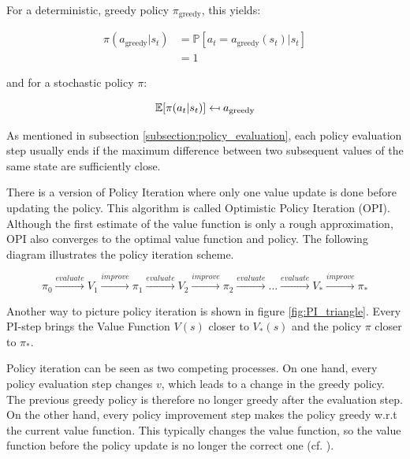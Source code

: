 For a deterministic, greedy policy $\pi_{\text{greedy}}$, this yields:

\begin{align}
\pi(a_{\text{greedy}}|s_t)&=\mathbb{P}[a_t=a_{\text{greedy}}(s_t)|s_t] \\ &=1
\end{align}

and for a stochastic policy $\pi$:

\begin{equation}
\mathbb{E}[\pi(a_t | s_t)] \mathrel{\reflectbox{\ensuremath{\mapsto}}} a_{\text{greedy}}
\end{equation}

As mentioned in subsection \ref{subsection:policy_evaluation}, each policy evaluation step usually ends if the maximum difference between two subsequent values of the same state are sufficiently close.

There is a version of Policy Iteration where only one value update is done before updating the policy. This algorithm is called Optimistic Policy Iteration (OPI). Although the first estimate of the value function is only a rough approximation, OPI also converges to the optimal value function and policy. The following diagram illustrates the policy iteration scheme.

\begin{equation*}
\pi_0 \overset{evaluate}{\longrightarrow} V_1 \overset{improve}{\longrightarrow} \pi_1 \overset{evaluate}{\longrightarrow} V_2 \overset{improve}{\longrightarrow} \pi_2 \overset{evaluate}{\longrightarrow} ... \overset{evaluate}{\longrightarrow} V_* \overset{improve}{\longrightarrow} \pi_*
\label{eq:pi_scheme}
\end{equation*}

Another way to picture policy iteration is shown in figure \ref{fig:PI_triangle}. Every PI-step brings the Value Function $V(s)$ closer to $V_*(s)$ and the policy $\pi$ closer to $\pi_*$.

Policy iteration can be seen as two competing processes. On one hand, every policy evaluation step changes $v$, which leads to a change in the greedy policy. The previous greedy policy is therefore no longer greedy after the evaluation step. On the other hand, every policy improvement step makes the policy greedy w.r.t the current value function. This typically changes the value function, so the value function before the policy update is no longer the correct one (cf. \cite[section~4.6]{SuttonBarto2018}).

